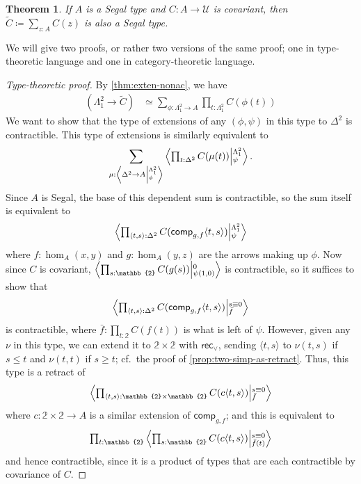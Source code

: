 \documentclass[12pt]{amsart}
\theoremstyle{plain}
\newtheorem{thm}{Theorem}[section]
\theoremstyle{definition}
\theoremstyle{remark}
\numberwithin{equation}{section}
\newcommand{\tprod}{\textstyle\prod}
\newcommand{\tsum}{\textstyle\sum}
\newcommand{\exten}[4]{\left\langle\mathchoice{\textstyle\prod_{#1}}{\textstyle\prod_{#1}}{\scriptstyle\prod_{#1}}{\scriptscriptstyle\prod_{#1}} #2 \middle|^{#3}_{#4}\right\rangle}
\newcommand{\ndexten}[4]{\left\langle #1 \to #2 \middle|^{#3}_{#4}\right\rangle}
\newcommand{\jdeq}{\equiv}
\newcommand{\defeq}{\coloneqq}
\newcommand{\univtype}{\mathcal{U}}
\newcommand{\pair}[1]{\langle #1\rangle}
\newcommand{\rec}{\mathsf{rec}}
\newcommand{\two}{\mathbb{2}}
\newcommand{\iscomp}[2]{\mathsf{comp}_{#1,#2}}
\begin{document}
\begin{thm}\label{thm:covariant-segal}
  If $A$ is a Segal type and $C:A\to\univtype$ is covariant, then $\tilde C \defeq \sum_{z:A} C(z)$ is also a Segal type.
\end{thm}
We will give two proofs, or rather two versions of the same proof; one in type-theoretic language and one in category-theoretic language.
\begin{proof}[Type-theoretic proof]
  By \cref{thm:exten-nonac}, we have
  \begin{align*}
    (\Lambda^2_1 \to \tilde C)
    &\simeq \tsum_{\phi:\Lambda^2_1 \to A} \tprod_{t:\Lambda^2_1} C(\phi(t))
  \end{align*}
  We want to show that the type of extensions of any $(\phi,\psi)$ in this type to $\Delta^2$ is contractible.
  This type of extensions is similarly equivalent to
  \[ \sum_{\mu:\ndexten{\Delta^2}{A}{\Lambda^2_1}{\phi}} \exten{t:\Delta^2}{C(\mu(t))}{\Lambda^2_1}{\psi}. \]
  Since $A$ is Segal, the base of this dependent sum is contractible, so the sum itself is equivalent to
  \[ \exten{\pair{t,s}:\Delta^2}{C(\iscomp g f\pair{t,s})}{\Lambda^2_1}{\psi} \]
  where $f:\hom_A(x,y)$ and $g:\hom_A(y,z)$ are the arrows making up $\phi$.
  Now since $C$ is covariant, $\exten{s:\two}{C(g(s))}{0}{\psi(1,0)}$ is contractible, so it suffices to show that
  \[ \exten{\pair{t,s}:\Delta^2}{C(\iscomp g f\pair{t,s})}{s\jdeq 0}{\bar f} \]
  is contractible, where $\bar f : \tprod_{t:\two} C(f(t))$ is what is left of $\psi$.
  However, given any $\nu$ in this type, we can extend it to $\two\times\two$ with $\rec_\lor$, sending $\pair{t,s}$ to $\nu(t,s)$ if $s\le t$ and $\nu(t,t)$ if $s\ge t$; cf.~the proof of \cref{prop:two-simp-as-retract}.
  Thus, this type is a retract of 
  \[ \exten{\pair{t,s}:\two\times\two}{C(c\pair{t,s})}{s\jdeq 0}{\bar f} \]
  where $c:\two\times\two\to A$ is a similar extension of $\iscomp g f$; and this is equivalent to
  \[ \tprod_{t:\two}\exten{s:\two}{C(c\pair{t,s})}{s\jdeq 0}{\bar f(t)} \]
  and hence contractible, since it is a product of types that are each contractible by covariance of $C$.
\end{proof}
\end{document}
